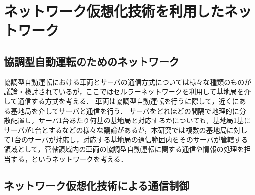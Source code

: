 \documentclass[a4paper,11pt,uplatex]{ujreport}
\begin{document}
\section{ネットワーク仮想化技術を利用したネットワーク}
\label{sec:ネットワーク仮想化技術を利用したネットワーク}

\subsection{協調型自動運転のためのネットワーク}

協調型自動運転における車両とサーバの通信方式については様々な種類のものが議論・検討されているが，ここではセルラーネットワークを利用して基地局を介して通信する方式を考える．
車両は協調型自動運転を行うに際して，近くにある基地局を介してサーバと通信を行う．
サーバをどれほどの間隔で地理的に分散配置し，サーバ1台あたり何基の基地局と対応するかについても，基地局1基にサーバが1台とするなどの様々な議論があるが，本研究では複数の基地局に対して1台のサーバが対応し，対応する基地局の通信範囲内をそのサーバが管轄する領域として，管轄領域内の車両の協調型自動運転に関する通信や情報の処理を担当する，というネットワークを考える．


\subsection{ネットワーク仮想化技術による通信制御}
\end{document}
